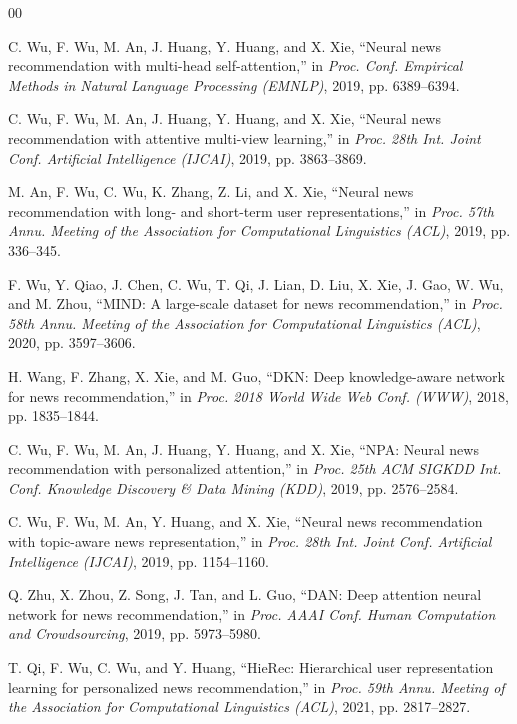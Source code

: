 \documentclass[conference]{IEEEtran}
\begin{document}
\begin{thebibliography}{00}

 C. Wu, F. Wu, M. An, J. Huang, Y. Huang, and X. Xie, ``Neural news recommendation with multi-head self-attention,'' in \emph{Proc. Conf. Empirical Methods in Natural Language Processing (EMNLP)}, 2019, pp. 6389--6394.

 C. Wu, F. Wu, M. An, J. Huang, Y. Huang, and X. Xie, ``Neural news recommendation with attentive multi-view learning,'' in \emph{Proc. 28th Int. Joint Conf. Artificial Intelligence (IJCAI)}, 2019, pp. 3863--3869.

 M. An, F. Wu, C. Wu, K. Zhang, Z. Li, and X. Xie, ``Neural news recommendation with long- and short-term user representations,'' in \emph{Proc. 57th Annu. Meeting of the Association for Computational Linguistics (ACL)}, 2019, pp. 336--345.

 F. Wu, Y. Qiao, J. Chen, C. Wu, T. Qi, J. Lian, D. Liu, X. Xie, J. Gao, W. Wu, and M. Zhou, ``MIND: A large-scale dataset for news recommendation,'' in \emph{Proc. 58th Annu. Meeting of the Association for Computational Linguistics (ACL)}, 2020, pp. 3597--3606.

 H. Wang, F. Zhang, X. Xie, and M. Guo, ``DKN: Deep knowledge-aware network for news recommendation,'' in \emph{Proc. 2018 World Wide Web Conf. (WWW)}, 2018, pp. 1835--1844.

 C. Wu, F. Wu, M. An, J. Huang, Y. Huang, and X. Xie, ``NPA: Neural news recommendation with personalized attention,'' in \emph{Proc. 25th ACM SIGKDD Int. Conf. Knowledge Discovery \& Data Mining (KDD)}, 2019, pp. 2576--2584.

 C. Wu, F. Wu, M. An, Y. Huang, and X. Xie, ``Neural news recommendation with topic-aware news representation,'' in \emph{Proc. 28th Int. Joint Conf. Artificial Intelligence (IJCAI)}, 2019, pp. 1154--1160.

 Q. Zhu, X. Zhou, Z. Song, J. Tan, and L. Guo, ``DAN: Deep attention neural network for news recommendation,'' in \emph{Proc. AAAI Conf. Human Computation and Crowdsourcing}, 2019, pp. 5973--5980.

 T. Qi, F. Wu, C. Wu, and Y. Huang, ``HieRec: Hierarchical user representation learning for personalized news recommendation,'' in \emph{Proc. 59th Annu. Meeting of the Association for Computational Linguistics (ACL)}, 2021, pp. 2817--2827.


\end{thebibliography}
\end{document}
